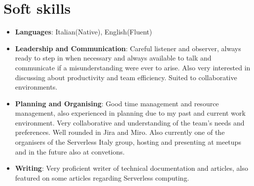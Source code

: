 \documentclass[a4paper,20pt]{article}
\begin{document}
\section{Soft skills}
\begin{itemize} 
    \item \textbf{Languages}: Italian(Native), English(Fluent)
    \item \textbf{Leadership and Communication}: Careful listener and observer, 
    always ready to step in when necessary and always available to talk and 
    communicate if a misunderstanding were ever to arise. Also very interested 
    in discussing about productivity and team efficiency. Suited to 
    collaborative environments. \vspace{-5pt}
    \item \textbf{Planning and Organising}: Good time management and resource 
    management, also experienced in planning due to my past and current work 
    environment. Very collaborative and understanding of the team's needs and 
    preferences. Well rounded in Jira and Miro. Also currently one of the 
    organisers of the Serverless Italy group, hosting and presenting at meetups 
    and in the future also at convetions. \vspace{-5pt}
    \item \textbf{Writing}: Very proficient writer of technical documentation 
    and articles, also featured on some articles regarding Serverless computing.
    \vspace{-5pt}
\end{itemize}
\vspace{-0pt}
\end{document}
